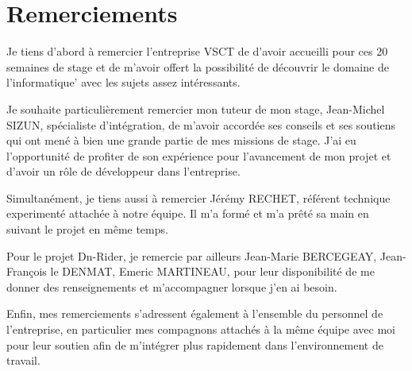 \chapter*{Remerciements}

Je tiens d’abord à remercier l’entreprise VSCT de d’avoir accueilli pour ces 20 semaines de stage et de m’avoir offert la possibilité de découvrir le
domaine de l'informatique' avec les sujets assez intéressants.

Je souhaite particulièrement remercier mon tuteur de mon stage, Jean-Michel SIZUN, spécialiste d'intégration, de m’avoir accordée ses conseils et ses soutiens qui
ont mené à bien une grande partie de mes missions de stage. J’ai eu l’opportunité de profiter de
son expérience pour l’avancement de mon projet et d'avoir un rôle de développeur dans l’entreprise.

Simultanément, je tiens aussi à remercier Jérémy RECHET, référent technique experimenté
attachée à notre équipe. Il m’a formé et m’a prêté sa main en suivant le projet en même temps.

Pour le projet Dn-Rider, je remercie par ailleurs Jean-Marie BERCEGEAY, Jean-François le DENMAT, Emeric MARTINEAU, pour leur disponibilité de me donner des
renseignements et m’accompagner lorsque j'en ai besoin.

Enfin, mes remerciements s’adressent également à l’ensemble du personnel de l’entreprise, en
particulier mes compagnons attachés à la même équipe avec moi pour leur soutien afin de
m’intégrer plus rapidement dans l’environnement de travail.

